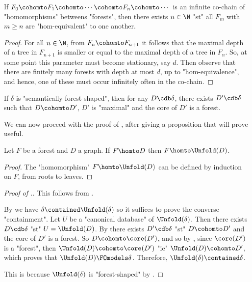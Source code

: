 \begin{fact}
	If $F_0 \cohomto F_1 \cohomto \cdots \cohomto F_n \cohomto \cdots$
	is an infinite co-chain of "homomorphisms" betweens "forests", 
	then there exists $n \in \N$ "st" all $F_m$ with $m\geq n$
	are "hom-equivalent" to one another.
\end{fact}

\begin{proof}
	For all $n \in \N$, from $F_n \cohomto F_{n+1}$ it follows that
	the maximal depth of a tree in $F_{n+1}$ is smaller or equal to the
	maximal depth of a tree in $F_{n}$. So, at some point this parameter
	must become stationary, say $d$. Then observe that there
	are finitely many forests with depth at most $d$, up to "hom-equivalence",
	and hence, one of these must occur infinitely often in the co-chain.
\end{proof}

\begin{corollary}
	\AP\label{coro:all-cdb-are-dominated-by-forests}
	If $\delta$ is "semantically forest-shaped", then for any
	$D \cdb \delta$, there exists $D' \cdb \delta$ such that
	$D \cohomto D'$, $D'$ is "maximal" and the core of $D'$ is a forest.
\end{corollary}

We can now proceed with the proof of , after giving a
proposition that will prove useful.

\begin{proposition}
	\AP\label{prop:hom-from-forest}
	Let $F$ be a forest and $D$ a graph. If $F \homto D$ then $F \homto \Unfold(D)$.
\end{proposition}

\begin{proof}
	The "homomorphism" $F \homto \Unfold(D)$ can be defined by induction on $F$, from roots
	to leaves.
\end{proof}

\begin{proof}[Proof of .]
	 This follows from
	.

	 By  we have $\delta \contained \Unfold(\delta)$ so it suffices to prove the converse "containment".
	Let $U$ be a "canonical database" of $\Unfold(\delta)$. Then there exists $D \cdb \delta$
	"st" $U = \Unfold(D)$. By  there exists
	$D' \cdb \delta$ "st" $D \cohomto D'$ and the core of $D'$ is a forest. So $D \cohomto \core(D')$, and so by , since $\core(D')$ is a "forest",
	then $\Unfold(D) \cohomto \core(D')$ "ie" $\Unfold(D) \cohomto D'$, which proves
	that $\Unfold(D) \FOmodels \delta$. Therefore, $\Unfold(\delta) \contained \delta$.

	 This is because $\Unfold(\delta)$ is "forest-shaped"
		by .
\end{proof}